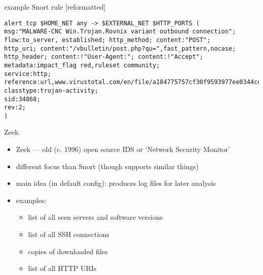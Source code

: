\begin{frame}[fragile]{example Snort rule [reformatted]}
\begin{Verbatim}[fontsize=\fontsize{10}{11}\selectfont]
alert tcp $HOME_NET any -> $EXTERNAL_NET $HTTP_PORTS (
msg:"MALWARE-CNC Win.Trojan.Rovnix variant outbound connection";
flow:to_server, established; http_method; content:"POST";
http_uri; content:"/vbulletin/post.php?qu=",fast_pattern,nocase;
http_header; content:!"User-Agent:"; content:!"Accept";
metadata:impact_flag red,ruleset community;
service:http;
reference:url,www.virustotal.com/en/file/a184775757cf30f9593977ee0344cd6c54deb4b14a012a7af8e3a2cdbb85a749/analysis/;
classtype:trojan-activity;
sid:34868;
rev:2;
)
\end{Verbatim}
\end{frame}

\begin{frame}[fragile]{Zeek}
    \begin{itemize}
    \item Zeek --- old (c. 1996) open source IDS or `Network Security Monitor'
    \item different focus than Snort (though supports similar things)
    \vspace{.5cm}
    \item main idea (in default config): produces log files for later analysis
    \item examples:
        \begin{itemize}
        \item list of all seen servers and software versions
        \item list of all SSH connections
        \item copies of downloaded files
        \item list of all HTTP URIs
        \end{itemize}
    \end{itemize}
\end{frame}

